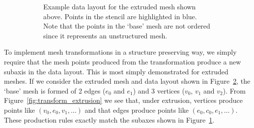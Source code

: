 \begin{figure}
\begin{subfigure}{\textwidth}
    \caption{
      Example data layout for the extruded mesh shown above.
      Points in the stencil are highlighted in blue.
      Note that the points in the `base' mesh are not ordered since it represents an unstructured mesh.
    }
    \label{fig:extruded_data}
  \end{subfigure}
  \caption{}
  \label{fig:extruded_patch_and_data}
\end{figure}

To implement mesh transformations in a structure preserving way, we simply require that the mesh points produced from the transformation produce a new subaxis in the data layout.
This is most simply demonstrated for extruded meshes.
If we consider the extruded mesh and data layout shown in Figure~\ref{fig:extruded_patch_and_data}, the `base' mesh is formed of 2 edges ($e_0$ and $e_1$) and 3 vertices ($v_0$, $v_1$ and $v_2$).
From Figure~\ref{fig:transform_extrusion} we see that, under extrusion, vertices produce points like $(v_0, e_0, v_1, \dots)$ and that edges produce points like $(e_0, c_0, e_1, \dots)$.
These production rules exactly match the subaxes shown in Figure~\ref{fig:extruded_data}.

